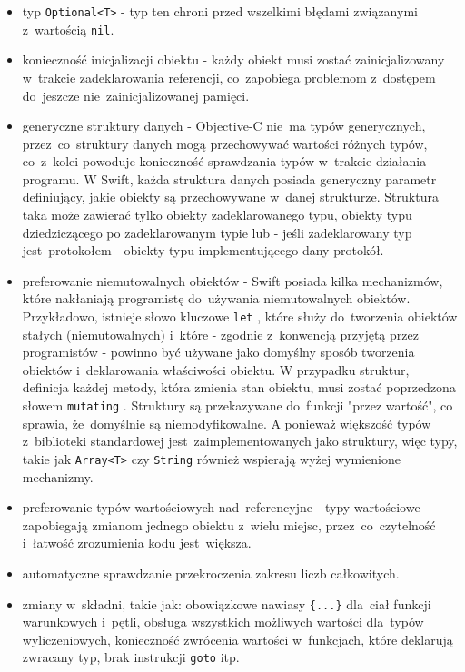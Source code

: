 \documentclass[mgr, shortabstract]{iithesis}
\newcommand{\swiftinline}[1]{
    \texttt{#1}
}
\begin{document}
\begin{itemize}
    \item typ \texttt{Optional<T>} - typ ten chroni przed wszelkimi błędami związanymi z~wartością \texttt{nil}.
    \item konieczność inicjalizacji obiektu - każdy obiekt musi zostać zainicjalizowany w~trakcie zadeklarowania referencji, co~zapobiega problemom z~dostępem do~jeszcze nie~zainicjalizowanej pamięci.
    \item generyczne struktury danych - Objective-C nie~ma typów generycznych, przez~co~struktury danych mogą przechowywać wartości różnych typów, co~z~kolei powoduje konieczność sprawdzania typów w~trakcie działania programu. W Swift, każda struktura danych posiada generyczny parametr definiujący, jakie obiekty są przechowywane w~danej strukturze. Struktura taka może zawierać tylko obiekty zadeklarowanego typu, obiekty typu dziedziczącego po zadeklarowanym typie lub - jeśli zadeklarowany typ jest~protokołem - obiekty typu implementującego dany protokół.
    \item preferowanie niemutowalnych obiektów - Swift posiada kilka mechanizmów, które nakłaniają programistę do~używania niemutowalnych obiektów. Przykładowo, istnieje słowo kluczowe \swiftinline{let}, które służy do~tworzenia obiektów stałych (niemutowalnych) i~które - zgodnie z~konwencją przyjętą przez programistów - powinno być używane jako domyślny sposób tworzenia obiektów i~deklarowania właściwości obiektu. W przypadku struktur, definicja każdej metody, która zmienia stan obiektu, musi zostać poprzedzona słowem \swiftinline{mutating}. Struktury są przekazywane do~funkcji "przez wartość", co sprawia, że~domyślnie są niemodyfikowalne. A ponieważ większość typów z~biblioteki standardowej jest~zaimplementowanych jako struktury, więc typy, takie jak \swiftinline{Array<T>} czy \swiftinline{String} również wspierają wyżej wymienione mechanizmy.
    \item preferowanie typów wartościowych nad~referencyjne - typy wartościowe zapobiegają zmianom jednego obiektu z~wielu miejsc, przez~co~czytelność i~łatwość zrozumienia kodu jest~większa.
    \item automatyczne sprawdzanie przekroczenia zakresu liczb całkowitych.
    \item zmiany w~składni, takie jak: obowiązkowe nawiasy \texttt{\{...\}} dla~ciał funkcji warunkowych i~pętli, obsługa wszystkich możliwych wartości dla~typów wyliczeniowych, konieczność zwrócenia wartości w~funkcjach, które deklarują zwracany typ, brak instrukcji \texttt{goto} itp.
\end{itemize}
\end{document}
